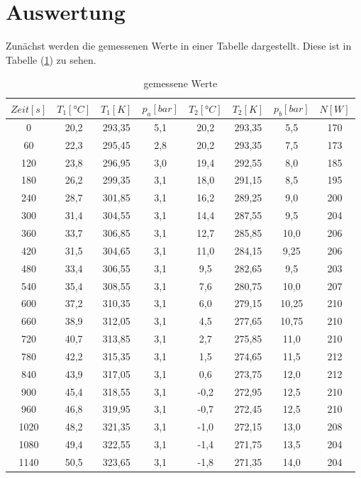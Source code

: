 
\section{Auswertung}
Zunächst werden die gemessenen Werte in einer Tabelle dargestellt.
Diese ist in Tabelle (\ref{tab:1}) zu sehen.

\begin{table}
  \centering
  \caption{gemessene Werte}
  \label{tab:1}
  \begin{tabular}{c c c c c c c c}
    \toprule $Zeit[s]$ & $T_1[°C]$ & $T_1[K]$ &  $p_a[bar]$ & $T_2[°C]$ & $T_2[K]$ &
    $p_b[bar]$ & $N[W]$\\
    \midrule
    0   & 20,2 & 293,35 & 5,1 & 20,2 & 293,35 & 5,5  & 170 \\
    60  & 22,3 & 295,45 & 2,8 & 20,2 & 293,35 & 7,5  & 173 \\
    120 & 23,8 & 296,95 & 3,0 & 19,4 & 292,55 & 8,0  & 185 \\
    180 & 26,2 & 299,35 & 3,1 & 18,0 & 291,15 & 8,5  & 195 \\
    240 & 28,7 & 301,85 & 3,1 & 16,2 & 289,25 & 9,0  & 200 \\
    300 & 31,4 & 304,55 & 3,1 & 14,4 & 287,55 & 9,5  & 204 \\
    360 & 33,7 & 306,85 & 3,1 & 12,7 & 285,85 & 10,0  & 206 \\
    420 & 31,5 & 304,65 & 3,1 & 11,0 & 284,15 & 9,25 & 206 \\
    480 & 33,4 & 306,55 & 3,1 &  9,5 & 282,65 & 9,5  & 203 \\
    540 & 35,4 & 308,55 & 3,1 &  7,6 & 280,75 & 10,0  & 207 \\
    600 & 37,2 & 310,35 & 3,1 &  6,0 & 279,15 & 10,25 & 210 \\
    660 & 38,9 & 312,05 & 3,1 &  4,5 & 277,65 & 10,75 & 210 \\
    720 & 40,7 & 313,85 & 3,1 &  2,7 & 275,85 & 11,0 & 210 \\
    780 & 42,2 & 315,35 & 3,1 &  1,5 & 274,65 & 11,5 & 212 \\
    840 & 43,9 & 317,05 & 3,1 &  0,6 & 273,75 & 12,0 & 212 \\
    900 & 45,4 & 318,55 & 3,1 & -0,2 & 272,95 & 12,5 & 210 \\
    960 & 46,8 & 319,95 & 3,1 & -0,7 & 272,45 & 12,5 & 210 \\
    1020& 48,2 & 321,35 & 3,1 & -1,0 & 272,15 & 13,0 & 208 \\
    1080& 49,4 & 322,55 & 3,1 & -1,4 & 271,75 & 13,5 & 204 \\
    1140& 50,5 & 323,65 & 3,1 & -1,8 & 271,35 & 14,0 & 204 \\
    \bottomrule
  \end{tabular}
\end{table}
